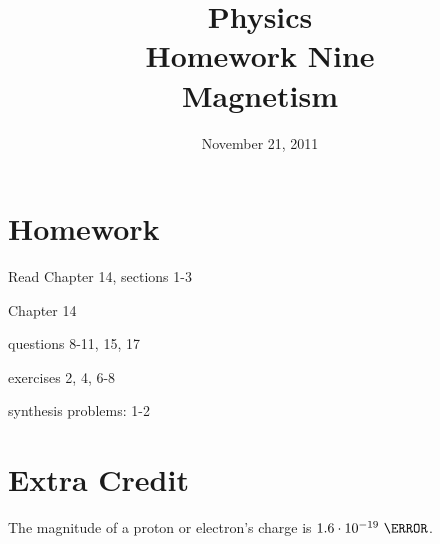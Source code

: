 \documentclass{exam}
\title{Physics \\ Homework Nine \\ Magnetism}
\date{November 21, 2011}
\begin{document}
\maketitle

\section{Homework}

\begin{itemize*}
  \item Read Chapter 14, sections 1-3
  \item Chapter 14
    \begin{itemize*}
      \item questions 8-11, 15, 17
      \item exercises 2, 4, 6-8
      \item synthesis problems: 1-2
    \end{itemize*}
\end{itemize*}

\section{Extra Credit}

The magnitude of a proton or electron's charge is $1.6 \cdot 10^{-19} \ \coulomb$.
\end{document}
